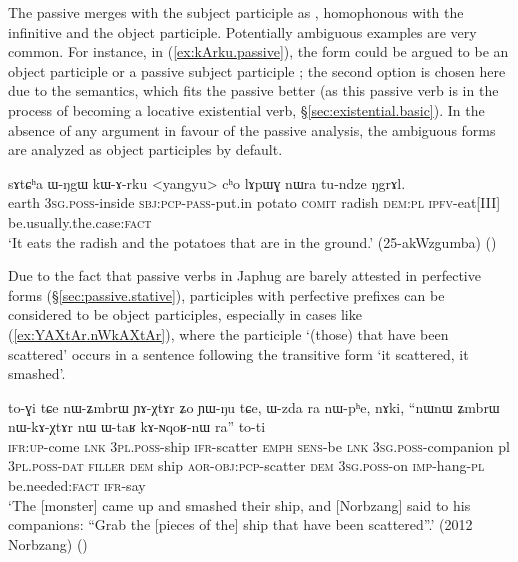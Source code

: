 The passive  merges with the subject participle as , homophonous with the infinitive and the object participle. Potentially ambiguous examples are very common. For instance, in (\ref{ex:kArku.passive}), the form  could be argued to be an object participle  or a passive subject participle ; the second option is chosen here due to the semantics, which fits the passive  better (as this passive verb is in the process of becoming a locative existential verb, §\ref{sec:existential.basic}). In the absence of any argument in favour of the passive analysis, the ambiguous  forms are analyzed as object participles by default.

\begin{exe}
\ex \label{ex:kArku.passive}
 \gll  sɤtɕʰa ɯ-ŋgɯ kɯ-ɤ-rku <yangyu> cʰo lɤpɯɣ nɯra tu-ndze ŋgrɤl. \\
 earth \textsc{3sg}.\textsc{poss}-inside \textsc{sbj}:\textsc{pcp}-\textsc{pass}-put.in potato \textsc{comit} radish \textsc{dem}:\textsc{pl} \textsc{ipfv}-eat[III] be.usually.the.case:\textsc{fact} \\
 \glt `It eats the radish and the potatoes that are in the ground.' (25-akWzgumba)
()
\end{exe}

Due to the fact that passive verbs in Japhug are barely attested in perfective forms (§\ref{sec:passive.stative}), participles with perfective prefixes can be considered to be object participles, especially in cases like (\ref{ex:YAXtAr.nWkAXtAr}), where the participle   `(those) that have been scattered' occurs in a sentence following the transitive form  `it scattered, it smashed'.

\begin{exe}
\ex \label{ex:YAXtAr.nWkAXtAr}
 \gll    to-ɣi tɕe nɯ-ʑmbrɯ ɲɤ-χtɤr ʑo ɲɯ-ŋu tɕe, ɯ-zda ra nɯ-pʰe, nɤki,  ``nɯnɯ ʑmbrɯ nɯ-kɤ-χtɤr nɯ ɯ-taʁ kɤ-ɴqoʁ-nɯ ra'' to-ti\\
 \textsc{ifr}:\textsc{up}-come \textsc{lnk} \textsc{3pl}.\textsc{poss}-ship \textsc{ifr}-scatter \textsc{emph} \textsc{sens}-be \textsc{lnk} \textsc{3sg}.\textsc{poss}-companion pl \textsc{3pl}.\textsc{poss}-\textsc{dat} \textsc{filler} \textsc{dem} ship \textsc{aor}-\textsc{obj}:\textsc{pcp}-scatter \textsc{dem} \textsc{3sg}.\textsc{poss}-on \textsc{imp}-hang-\textsc{pl} be.needed:\textsc{fact} \textsc{ifr}-say\\
 \glt `The [monster] came up and smashed their ship, and [Norbzang] said to his companions: ``Grab the [pieces of the] ship that have been scattered''.' (2012 Norbzang)
()
\end{exe}


